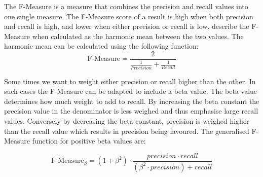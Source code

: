 The F-Measure is a measure that combines the precision and recall values into one single measure. The F-Measure score of a result is high when both precision and recall is high, and lower when either precision or recall is low. \cite{Baeza-Yates2011b} describe the F-Measure when calculated as the harmonic mean between the two values. The harmonic mean can be calculated using the following function:
\begin{displaymath}
\text{F-Measure} = \frac{2}{\frac{1}{Precision} + \frac{1}{Recall}}
\end{displaymath}

Some times we want to weight either precision or recall higher than the other. In such cases the F-Measure can be adapted to include a beta value. The beta value determines how much weight to add to recall. By increasing the beta constant the precision value in the denominator is less weighed and thus emphasise large recall values. Conversely by decreasing the beta constant, precision is weighed higher than the recall value which results in precision being favoured. The generalised F-Measure function for positive beta values are:

\begin{displaymath}
\text{F-Measure}_{\beta} = (1 + \beta^{2}) \cdot \frac{precision \cdot recall}{(\beta^{2} \cdot precision) + recall}
\end{displaymath}






